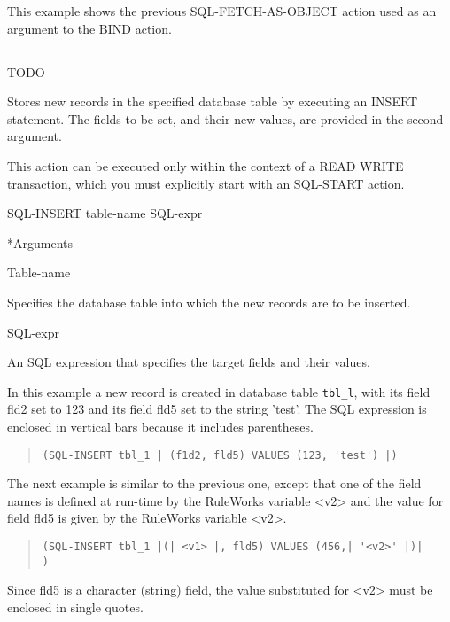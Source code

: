 {{This example shows the previous SQL-FETCH-AS-OBJECT action
used as an argument to the BIND action.

\subsection{}
TODO

Stores new records in the specified database table by
executing an INSERT statement. The fields to be set, and
their new values, are provided in the second argument.

This action can be executed only within the context of a READ
WRITE transaction, which you must explicitly start with an
SQL-START action.



\Format

SQL-INSERT table-name SQL-expr



*Arguments

Table-name

Specifies the database table into which the new records are
to be inserted.

SQL-expr

An SQL expression that specifies the target fields and their
values.



\Example

In this example a new record is created in database table
\verb|tbl_l|, with its field fld2 set to 123 and its field fld5 set
to the string 'test'. The SQL expression is enclosed in
vertical bars because it includes parentheses.

\begin{quote}
\begin{verbatim}
(SQL-INSERT tbl_1 | (f1d2, fld5) VALUES (123, 'test') |)
\end{verbatim}
\end{quote}

The next example is similar to the previous one, except that
one of the field names is defined at run-time by the
RuleWorks variable <v2> and the value for field fld5 is given
by the RuleWorks variable <v2>.
\begin{quote}
\begin{verbatim}
(SQL-INSERT tbl_1 |(| <v1> |, fld5) VALUES (456,| '<v2>' |)|
)
\end{verbatim}
\end{quote}

Since fld5 is a character (string) field, the value
substituted for <v2> must be enclosed in single quotes.

}}
